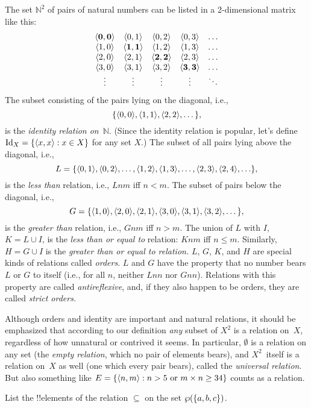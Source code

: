 \documentclass[../../../include/open-logic-section]{subfiles}
\begin{document}
\begin{ex}
The set $\mathbb{N}^{2}$ of
pairs of natural numbers can be listed in a 2-dimensional matrix like
this:
\[
\begin{array}{ccccc}
\mathbf{\tuple{ 0,0 }} & \tuple{ 0,1 } &
  \tuple{ 0,2 } & \tuple{ 0,3 } & \ldots\\
\tuple{ 1,0 } & \mathbf{\tuple{ 1,1 }} &
  \tuple{ 1,2 } & \tuple{ 1,3 } & \ldots\\
\tuple{ 2,0 } & \tuple{ 2,1 } &
  \mathbf{\tuple{ 2,2 }} & \tuple{ 2,3 } & \ldots\\
\tuple{ 3,0 } & \tuple{ 3,1 } & \tuple{ 3,2 } &
  \mathbf{\tuple{ 3,3 }} & \ldots\\
\vdots & \vdots & \vdots & \vdots & \mathbf{\ddots}
\end{array}
\]
The subset consisting of the pairs lying on the diagonal, i.e.,
\[
\{\langle 0,0  \rangle, \langle  1,1  \rangle, \langle  2,2  \rangle, \dots\},
\]
is the \emph{identity relation on}~$\mathbb{N}$. (Since the identity
relation is popular, let's define $\mathord{\mathrm{Id}_{X}}=\{ \langle  x,x  \rangle : x \in
  X \}$ for any set $X$.) The subset of all pairs lying above the
diagonal, i.e.,
\[
L = \{\langle  0,1  \rangle,\langle  0,2  \rangle,\ldots,\langle  1,2  \rangle,
\langle  1,3  \rangle, \dots, \langle  2,3  \rangle, \langle  2,4  \rangle,\ldots\},
\]
is the \emph{less than} relation, i.e., $Lnm$ iff $n<m$. The subset of
pairs below the diagonal, i.e.,
\[
G=\{ \langle  1,0  \rangle,\langle  2,0  \rangle,\langle 
  2,1  \rangle, \langle  3,0  \rangle,\langle  3,1  \rangle,\langle  3,2  \rangle, \dots\},
\]
is the \emph{greater than} relation, i.e., $Gnm$ iff $n>m$. The union
of $L$ with $I$, $K=L\cup I$, is the \emph{less than or equal to}
relation: $Knm$ iff $n \le m$. Similarly, $H=G \cup I$ is the
\emph{greater than or equal to relation.} $L$, $G$, $K$, and $H$ are
special kinds of relations called \emph{orders}. $L$ and $G$ have the
property that no number bears $L$ or $G$ to itself (i.e., for all $n$,
neither $Lnn$ nor $Gnn$). Relations with this property are called
\emph{antireflexive}, and, if they also happen to be orders, they are
called \emph{strict orders.}
\end{ex}

\begin{explain}
Although orders and identity are important and natural relations, it
should be emphasized that according to our definition \emph{any}
subset of $X^{2}$ is a relation on~$X$, regardless of how unnatural or
contrived it seems. In particular, $\emptyset$ is a relation on any
set (the \emph{empty relation}, which no pair of elements bears), and
$X^{2}$~itself is a relation on~$X$ as well (one which every pair
bears), called the \emph{universal relation}. But also something like
$E=\{ \langle n, m \rangle : n>5 \text{ or } m \times n \ge 34 \}$ counts as
a relation.
\end{explain}

\begin{prob}
List the !!{element}s of the relation $\subseteq$ on the set
$\wp(\{a, b, c\})$.
\end{prob}
\end{document}
